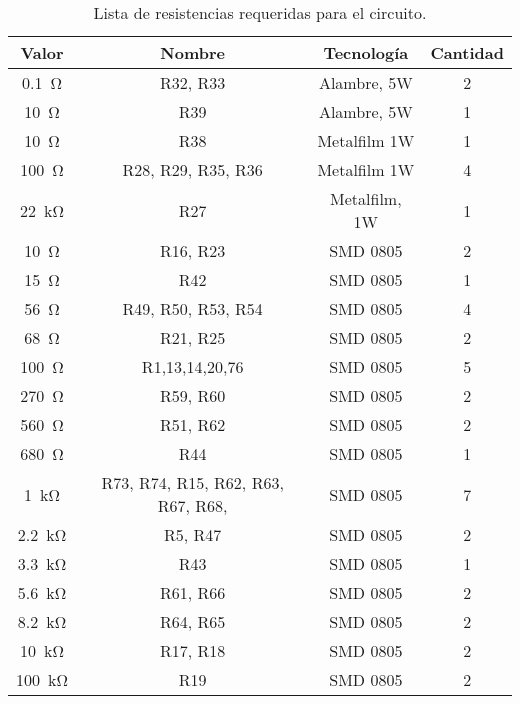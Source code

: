 \begin{table}[h!]
	\centering
	\begin{tabular}{cccc}
		\toprule
		Valor & Nombre & Tecnología & Cantidad \\
		\midrule
		\SI{0.1}{\ohm} & R32, R33 & Alambre, 5W & 2 \\
		\SI{10}{\ohm} & R39 & Alambre, 5W & 1 \\		
		\SI{10}{\ohm} & R38 & Metalfilm 1W & 1 \\
		\SI{100}{\ohm} & R28, R29, R35, R36 & Metalfilm 1W & 4 \\
		\SI{22}{\kilo\ohm} & R27 & Metalfilm, 1W & 1 \\
		\SI{10}{\ohm} & R16, R23 & SMD 0805 & 2 \\
		\SI{15}{\ohm} & R42 & SMD 0805 & 1 \\
		\SI{56}{\ohm} & R49, R50, R53, R54 & SMD 0805 & 4 \\
		\SI{68}{\ohm} & R21, R25 & SMD 0805 & 2 \\
		\SI{100}{\ohm} & R1,13,14,20,76 & SMD 0805 & 5 \\
		\SI{270}{\ohm} & R59, R60 & SMD 0805 & 2 \\ 
		\SI{560}{\ohm} & R51, R62 & SMD 0805 & 2 \\
		\SI{680}{\ohm} & R44 & SMD 0805 & 1\\
		\SI{1}{\kilo\ohm} & R73, R74, R15, R62, R63, R67, R68,  & SMD 0805 & 7 \\
		\SI{2.2}{\kilo\ohm} & R5, R47 & SMD 0805 & 2 \\ 
		\SI{3.3}{\kilo\ohm} & R43 & SMD 0805 & 1 \\
		\SI{5.6}{\kilo\ohm} & R61, R66 & SMD 0805 & 2 \\
		\SI{8.2}{\kilo\ohm} & R64, R65 & SMD 0805 & 2 \\
		\SI{10}{\kilo\ohm} & R17, R18 & SMD 0805 & 2 \\
		\SI{100}{\kilo\ohm} & R19 & SMD 0805 & 2 \\
		\bottomrule
	\end{tabular}
	\caption{Lista de resistencias requeridas para el circuito.}
	\label{tab:lst_resist}
\end{table}
